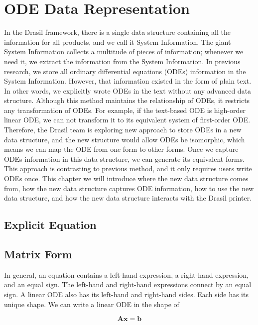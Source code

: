 \chapter{ODE Data Representation}
In the Drasil framework, there is a single data structure containing all the information for all products, and we call it System Information. The giant System Information collects a multitude of pieces of information; whenever we need it, we extract the information from the System Information. In previous research, we store all ordinary differential equations (ODEs) information in the System Information. However, that information existed in the form of plain text. In other words, we explicitly wrote ODEs in the text without any advanced data structure. Although this method maintains the relationship of ODEs, it restricts any transformation of ODEs. For example, if the text-based ODE is high-order linear ODE, we can not transform it to its equivalent system of first-order ODE. Therefore, the Drasil team is exploring new approach to store ODEs in a new data structure, and the new structure would allow ODEs be isomorphic, which means we can map the ODE from one form to other forms. Once we capture ODEs information in this data structure, we can generate its equivalent forms. This approach is contrasting to previous method, and it only requires users write ODEs once. This chapter we will introduce where the new data structure comes from, how the new data structure captures ODE information, how to use the new data structure, and how the new data structure interacts with the Drasil printer.

\section{Explicit Equation}

\section{Matrix Form}
In general, an equation contains a left-hand expression, a right-hand expression, and an equal sign. The left-hand and right-hand expressions connect by an equal sign. A linear ODE also has its left-hand and right-hand sides. Each side has its unique shape. We can write a linear ODE in the shape of

\begin{equation} \label{eq_matrixform}
	\boldsymbol{Ax} = \boldsymbol{b}
\end{equation}


